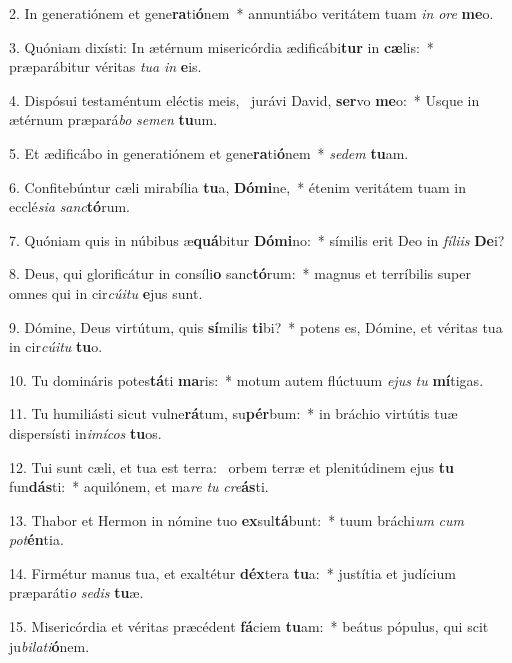 2. In generatiónem et gene\textbf{ra}ti\textbf{ó}nem~*  annuntiábo veritátem tuam \textit{in} \textit{o}\textit{re} \textbf{me}o.\

3. Quóniam dixísti: In ætérnum misericórdia ædificábi\textbf{tur} in \textbf{cæ}lis:~*  præparábitur véritas \textit{tu}\textit{a} \textit{in} \textbf{e}is.\

4. Dispósui testaméntum eléctis meis, \dag\  jurávi David, \textbf{ser}vo \textbf{me}o:~*  Usque in ætérnum præpará\textit{bo} \textit{se}\textit{men} \textbf{tu}um.\

5. Et ædificábo in generatiónem et gene\textbf{ra}ti\textbf{ó}nem~*  \textit{se}\textit{dem} \textbf{tu}am.\

6. Confitebúntur cæli mirabília \textbf{tu}a, \textbf{Dó}\textbf{mi}ne,~*  étenim veritátem tuam in ecclé\textit{si}\textit{a} \textit{sanc}\textbf{tó}rum.\

7. Quóniam quis in núbibus æ\textbf{quá}bitur \textbf{Dó}\textbf{mi}no:~*  símilis erit Deo in \textit{fí}\textit{li}\textit{is} \textbf{De}i?\

8. Deus, qui glorificátur in consíli\textbf{o} sanc\textbf{tó}rum:~*  magnus et terríbilis super omnes qui in cir\textit{cú}\textit{i}\textit{tu} \textbf{e}jus sunt.\

9. Dómine, Deus virtútum, quis \textbf{sí}milis \textbf{ti}bi?~*  potens es, Dómine, et véritas tua in cir\textit{cú}\textit{i}\textit{tu} \textbf{tu}o.\

10. Tu domináris potes\textbf{tá}ti \textbf{ma}ris:~*  motum autem flúctuum \textit{e}\textit{jus} \textit{tu} \textbf{mí}tigas.\

11. Tu humiliásti sicut vulne\textbf{rá}tum, su\textbf{pér}bum:~*  in bráchio virtútis tuæ dispersísti in\textit{i}\textit{mí}\textit{cos} \textbf{tu}os.\

12. Tui sunt cæli, et tua est terra: \dag\  orbem terræ et plenitúdinem ejus \textbf{tu} fun\textbf{dás}ti:~*  aquilónem, et ma\textit{re} \textit{tu} \textit{cre}\textbf{ás}ti.\

13. Thabor et Hermon in nómine tuo \textbf{ex}sul\textbf{tá}bunt:~*  tuum bráchi\textit{um} \textit{cum} \textit{pot}\textbf{én}tia.\

14. Firmétur manus tua, et exaltétur \textbf{déx}tera \textbf{tu}a:~*  justítia et judícium præparáti\textit{o} \textit{se}\textit{dis} \textbf{tu}æ.\

15. Misericórdia et véritas præcédent \textbf{fá}ciem \textbf{tu}am:~*  beátus pópulus, qui scit ju\textit{bi}\textit{la}\textit{ti}\textbf{ó}nem.\

